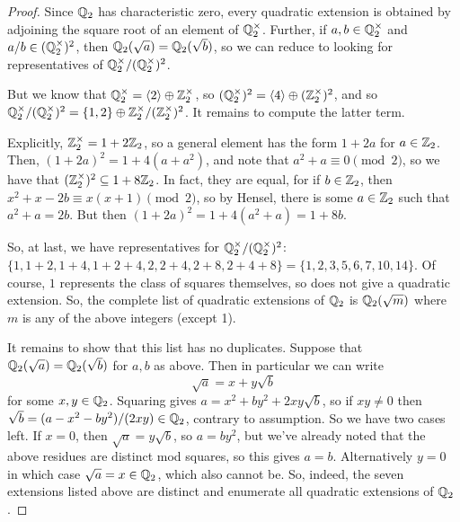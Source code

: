 \begin{proof}
	Since $\mathbb{Q}_2$ has characteristic zero, every quadratic extension is obtained by adjoining the square root of an element of $\mathbb{Q}_2^\times$. Further, if $a,b \in \mathbb{Q}_2^\times$ and $a/b \in (\mathbb{Q}_2^\times)^2$, then $\mathbb{Q}_2(\sqrt{a}) = \mathbb{Q}_2(\sqrt{b})$, so we can reduce to looking for representatives of $\mathbb{Q}_2^\times/(\mathbb{Q}_2^\times)^2$.
	
	But we know that $\mathbb{Q}_2^\times = \left<2\right> \oplus \mathbb{Z}_2^\times$, so $(\mathbb{Q}_2^\times)^2 = \left<4\right> \oplus (\mathbb{Z}_2^\times)^2$, and so $\mathbb{Q}_2^\times/(\mathbb{Q}_2^\times)^2 = \{1,2\} \oplus \mathbb{Z}_2^\times/(\mathbb{Z}_2^\times)^2$. It remains to compute the latter term.
	
	Explicitly, $\mathbb{Z}_2^\times = 1+2\mathbb{Z}_2$, so a general element has the form $1+2a$ for $a \in \mathbb{Z}_2$. Then, $(1+2a)^2 = 1+4(a+a^2)$, and note that $a^2+a \equiv 0 \pmod{2}$, so we have that $(\mathbb{Z}_2^\times)^2 \subseteq 1+8\mathbb{Z}_2$. In fact, they are equal, for if $b \in \mathbb{Z}_2$, then $x^2+x-2b \equiv x(x+1) \pmod{2}$, so by Hensel, there is some $a \in \mathbb{Z}_2$ such that $a^2+a = 2b$. But then $(1+2a)^2 = 1+4(a^2+a) = 1+8b$.
	
	So, at last, we have representatives for $\mathbb{Q}_2^\times/(\mathbb{Q}_2^\times)^2$: $\{ 1, 1+2, 1+4, 1+2+4, 2, 2+4, 2+8, 2+4+8 \} = \{ 1,2,3,5,6,7,10,14 \}$. Of course, $1$ represents the class of squares themselves, so does not give a quadratic extension. So, the complete list of quadratic extensions of $\mathbb{Q}_2$ is $\mathbb{Q}_2(\sqrt{m})$ where $m$ is any of the above integers (except 1).
	
	It remains to show that this list has no duplicates. Suppose that $\mathbb{Q}_2(\sqrt{a}) = \mathbb{Q}_2(\sqrt{b})$ for $a,b$ as above. Then in particular we can write
	\[ \sqrt{a} = x+y\sqrt{b} \]
	for some $x,y \in \mathbb{Q}_2$. Squaring gives $a = x^2+by^2+2xy\sqrt{b}$, so if $xy \neq 0$ then $\sqrt{b} = (a-x^2-by^2)/(2xy) \in \mathbb{Q}_2$, contrary to assumption. So we have two cases left. If $x=0$, then $\sqrt{a} = y\sqrt{b}$, so $a = by^2$, but we've already noted that the above residues are distinct mod squares, so this gives $a=b$. Alternatively $y=0$ in which case $\sqrt{a} = x \in \mathbb{Q}_2$, which also cannot be. So, indeed, the seven extensions listed above are distinct and enumerate all quadratic extensions of $\mathbb{Q}_2$.
\end{proof}
